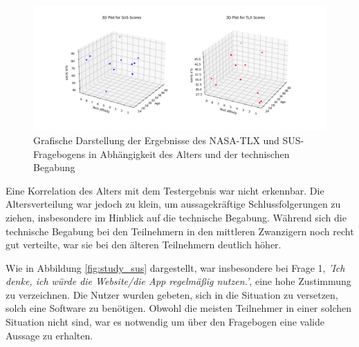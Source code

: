 \begin{figure}[h]
    \centering
    \includegraphics[width=\textwidth]{includes/figures/study/3dplot.png}
    \caption{Grafische Darstellung der Ergebnisse des NASA-TLX und SUS-Fragebogens in Abhängigkeit des Alters und der technischen Begabung}
\label{fig:3dplot_tlx_sus}
\end{figure}

Eine Korrelation des Alters mit dem Testergebnis war nicht erkennbar. Die Altersverteilung war jedoch zu klein, um aussagekräftige Schlussfolgerungen zu ziehen, insbesondere im Hinblick auf die technische 
Begabung. Während sich die technische Begabung bei den Teilnehmern in den mittleren Zwanzigern noch recht gut verteilte, war sie bei den älteren Teilnehmern deutlich höher.

Wie in Abbildung \ref{fig:study_sus} dargestellt, war insbesondere bei Frage 1, \textit{'Ich denke, ich würde die Website/die App regelmäßig nutzen.'}, eine hohe Zustimmung zu verzeichnen. Die Nutzer wurden 
gebeten, sich in die Situation zu versetzen, solch eine Software zu benötigen. Obwohl die meisten Teilnehmer in einer solchen Situation nicht sind, war es notwendig um über den Fragebogen eine valide Aussage zu erhalten.

